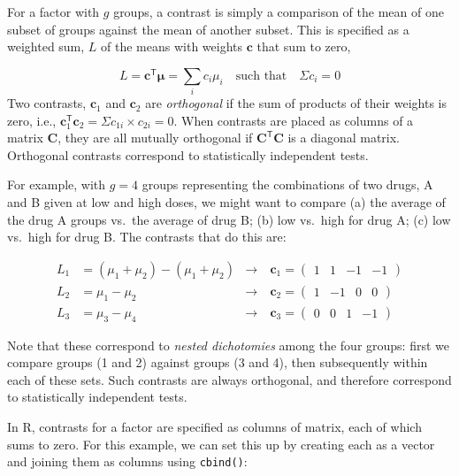 \documentclass[
  letterpaper,
  10pt,
  krantz2]{krantz}
\begin{document}
For a factor with \(g\) groups, a contrast is simply a comparison of the
mean of one subset of groups against the mean of another subset. This is
specified as a weighted sum, \(L\) of the means with weights
\(\mathbf{c}\) that sum to zero,

\[
L = \mathbf{c}^\mathsf{T} \boldsymbol{\mu} = \sum_i c_i \mu_i \quad\text{such that}\quad \Sigma c_i = 0
\] Two contrasts, \(\mathbf{c}_1\) and \(\mathbf{c}_2\) are
\emph{orthogonal} if the sum of products of their weights is zero, i.e.,
\(\mathbf{c}_1^\mathsf{T} \mathbf{c}_2 = \Sigma c_{1i} \times c_{2i} = 0\).
When contrasts are placed as columns of a matrix \(\mathbf{C}\), they
are all mutually orthogonal if \(\mathbf{C}^\mathsf{T} \mathbf{C}\) is a
diagonal matrix. Orthogonal contrasts correspond to statistically
independent tests.

For example, with \(g=4\) groups representing the combinations of two
drugs, A and B given at low and high doses, we might want to compare (a)
the average of the drug A groups vs.~the average of drug B; (b) low
vs.~high for drug A; (c) low vs.~high for drug B. The contrasts that do
this are:

\begin{align*}
L_1 & = (\mu_1 + \mu_2) - (\mu_1 + \mu_2) & \rightarrow\: & \mathbf{c}_1 = 
    \begin{pmatrix} 
     1 &  1 & -1 & -1 
    \end{pmatrix} \\
L_2 & = \mu_1 - \mu_2                     & \rightarrow\: & \mathbf{c}_2 = 
    \begin{pmatrix} 
     1 &  -1 & 0 & 0 
    \end{pmatrix} \\
L_3 & = \mu_3 - \mu_4                     & \rightarrow\: & \mathbf{c}_3 = 
    \begin{pmatrix} 
     0 &  0 & 1 & -1 
    \end{pmatrix}
\end{align*}

Note that these correspond to \emph{nested dichotomies} among the four
groups: first we compare groups (1 and 2) against groups (3 and 4), then
subsequently within each of these sets. Such contrasts are always
orthogonal, and therefore correspond to statistically independent tests.

In R, contrasts for a factor are specified as columns of matrix, each of
which sums to zero. For this example, we can set this up by creating
each as a vector and joining them as columns using \texttt{cbind()}:
\end{document}
